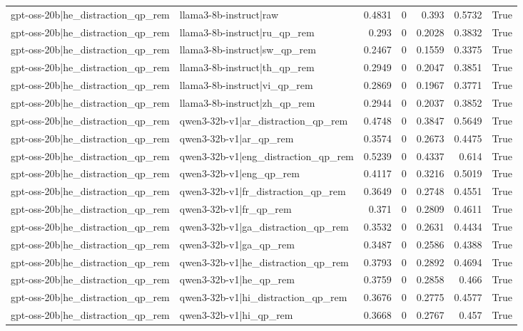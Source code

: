 \begin{table}
\begin{tabular}{l l r r r r l}
gpt-oss-20b|he_distraction_qp_rem & llama3-8b-instruct|raw & 0.4831 & 0 & 0.393 & 0.5732 & True \\
gpt-oss-20b|he_distraction_qp_rem & llama3-8b-instruct|ru_qp_rem & 0.293 & 0 & 0.2028 & 0.3832 & True \\
gpt-oss-20b|he_distraction_qp_rem & llama3-8b-instruct|sw_qp_rem & 0.2467 & 0 & 0.1559 & 0.3375 & True \\
gpt-oss-20b|he_distraction_qp_rem & llama3-8b-instruct|th_qp_rem & 0.2949 & 0 & 0.2047 & 0.3851 & True \\
gpt-oss-20b|he_distraction_qp_rem & llama3-8b-instruct|vi_qp_rem & 0.2869 & 0 & 0.1967 & 0.3771 & True \\
gpt-oss-20b|he_distraction_qp_rem & llama3-8b-instruct|zh_qp_rem & 0.2944 & 0 & 0.2037 & 0.3852 & True \\
gpt-oss-20b|he_distraction_qp_rem & qwen3-32b-v1|ar_distraction_qp_rem & 0.4748 & 0 & 0.3847 & 0.5649 & True \\
gpt-oss-20b|he_distraction_qp_rem & qwen3-32b-v1|ar_qp_rem & 0.3574 & 0 & 0.2673 & 0.4475 & True \\
gpt-oss-20b|he_distraction_qp_rem & qwen3-32b-v1|eng_distraction_qp_rem & 0.5239 & 0 & 0.4337 & 0.614 & True \\
gpt-oss-20b|he_distraction_qp_rem & qwen3-32b-v1|eng_qp_rem & 0.4117 & 0 & 0.3216 & 0.5019 & True \\
gpt-oss-20b|he_distraction_qp_rem & qwen3-32b-v1|fr_distraction_qp_rem & 0.3649 & 0 & 0.2748 & 0.4551 & True \\
gpt-oss-20b|he_distraction_qp_rem & qwen3-32b-v1|fr_qp_rem & 0.371 & 0 & 0.2809 & 0.4611 & True \\
gpt-oss-20b|he_distraction_qp_rem & qwen3-32b-v1|ga_distraction_qp_rem & 0.3532 & 0 & 0.2631 & 0.4434 & True \\
gpt-oss-20b|he_distraction_qp_rem & qwen3-32b-v1|ga_qp_rem & 0.3487 & 0 & 0.2586 & 0.4388 & True \\
gpt-oss-20b|he_distraction_qp_rem & qwen3-32b-v1|he_distraction_qp_rem & 0.3793 & 0 & 0.2892 & 0.4694 & True \\
gpt-oss-20b|he_distraction_qp_rem & qwen3-32b-v1|he_qp_rem & 0.3759 & 0 & 0.2858 & 0.466 & True \\
gpt-oss-20b|he_distraction_qp_rem & qwen3-32b-v1|hi_distraction_qp_rem & 0.3676 & 0 & 0.2775 & 0.4577 & True \\
gpt-oss-20b|he_distraction_qp_rem & qwen3-32b-v1|hi_qp_rem & 0.3668 & 0 & 0.2767 & 0.457 & True \\

\end{tabular}
\end{table}
